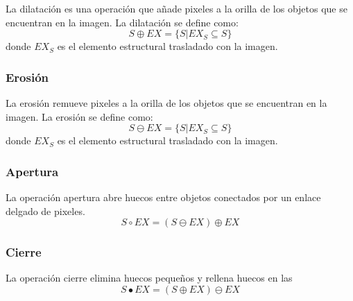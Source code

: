 La dilatación es una operación que añade pixeles a la orilla de los objetos que se encuentran en la imagen. La dilatación se define como:  
$$S \oplus EX = \lbrace S|EX_S \subseteq S \rbrace$$  
donde $EX_S$ es el elemento estructural trasladado con la imagen. 

\subsubsection{Erosión}\label{sssec:OMerosion}

La erosión remueve pixeles a la orilla de los objetos que se encuentran en la imagen. La erosión se define como: 
$$S \ominus EX = \lbrace S|EX_S \subseteq S \rbrace$$ 
donde $EX_S$ es el elemento estructural trasladado con la imagen. 

\subsubsection{Apertura}\label{sssec:Opening} 

La operación apertura abre huecos entre objetos conectados por un enlace delgado de pixeles.  
$$S \circ EX = (S \ominus EX) \oplus EX $$

\subsubsection{Cierre}\label{sssec:Closure}

La operación cierre elimina huecos pequeños  y rellena huecos en las
$$S \bullet EX = (S \oplus EX) \ominus EX $$


